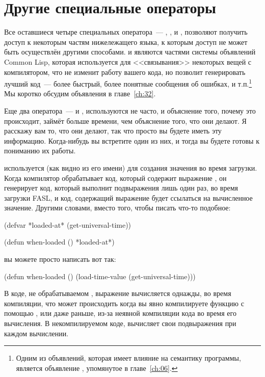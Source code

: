 \section{Другие специальные операторы}

Все оставшиеся четыре специальных оператора~--- , ,
 и , позволяют получить доступ к некоторым частям
нижележащего языка, к которым доступ не может быть осуществлён другими способами.
 и  являются частями системы объявлений Common Lisp, которая
используется для <<связывания>> некоторых вещей с компилятором, что не изменит работу
вашего кода, но позволит генерировать лучший код~--- более быстрый, более понятные
сообщения об ошибках, и т.п.\footnote{Одним из объявлений, которая имеет влияние на
  семантику программы, является объявление , упомянутое в главе~\ref{ch:06}.}
  Мы коротко обсудим объявления в главе~\ref{ch:32}.

Еще два оператора~---  и , используются не часто, и
объяснение того, почему это происходит, займёт больше времени, чем объяснение того, что
они делают. Я расскажу вам то, что они делают, так что просто вы будете иметь эту
информацию. Когда-нибудь вы встретите один из них, и тогда вы будете готовы к пониманию их
работы.

 используется (как видно из его имени) для создания значения во
время загрузки.  Когда компилятор обрабатывает код, который содержит выражение
, он генерирует код, который выполнит подвыражения лишь один раз, во
время загрузки FASL, и код, содержащий выражение  будет ссылаться на
вычисленное значение.  Другими словами, вместо того, чтобы писать что-то подобное:

\begin{myverb}
(defvar *loaded-at* (get-universal-time))

(defun when-loaded () *loaded-at*)
\end{myverb}

\noindent{}вы можете просто написать вот так:

\begin{myverb}
(defun when-loaded () (load-time-value (get-universal-time)))
\end{myverb}

В коде, не обрабатываемом , выражение 
вычисляется однажды, во время компиляции, что может происходить когда вы явно компилируете
функцию с помощью , или даже раньше, из-за неявной компиляции кода во время
его вычисления.  В некомпилируемом коде,  вычисляет свои
подвыражения при каждом вычислении.

